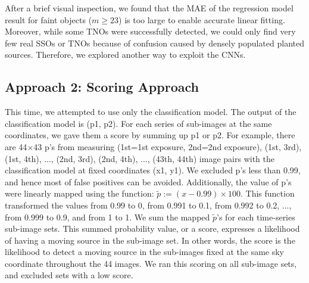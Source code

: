 
After a brief visual inspection, we found that the MAE of the regression model result for faint objects ($m\geq23$) is too large to enable accurate linear fitting.
Moreover, while some TNOs were successfully detected, we could only find very few real SSOs or TNOs because of confusion caused by densely populated planted sources.
Therefore, we explored another way to exploit the CNNs.

\subsection{Approach 2: Scoring Approach}
\label{subsect: Scoring Approach}

This time, we attempted to use only the classification model.
The output of the classification model is (p1, p2).
For each series of sub-images at the same coordinates, we gave them a score by summing up p1 or p2.
For example, there are 44$\times$43 p's from measuring (1st=1st exposure, 2nd=2nd exposure), (1st, 3rd), (1st, 4th), ..., (2nd, 3rd), (2nd, 4th), ..., (43th, 44th) image pairs with the classification model at fixed coordinates (x1, y1).
We excluded p's less than 0.99, and hence most of false positives can be avoided.
Additionally, the value of p's were linearly mapped using the function: $\tilde{p} := (x-0.99)\times100$. This function transformed the values from 0.99 to 0, from 0.991 to 0.1, from 0.992 to 0.2, ..., from 0.999 to 0.9, and from 1 to 1.
We sum the mapped $\tilde{p}$'s for each time-series sub-image sets.
This summed probability value, or a score, expresses a likelihood of having a moving source in the sub-image set.
In other words, the score is the likelihood to detect a moving source in the sub-images fixed at the same sky coordinate throughout the 44 images.
We ran this scoring on all sub-image sets, and excluded sets with a low score.

